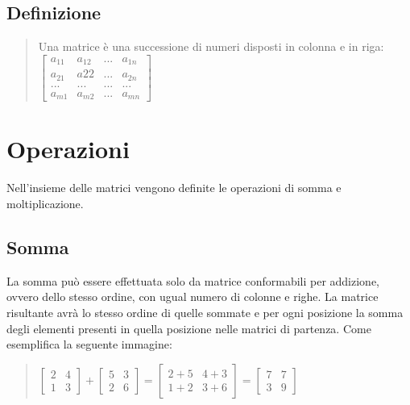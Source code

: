 \documentclass[a4paper]{article}
\begin{document}
\subsection{Definizione}

\vspace*{\fill} 
\begin{quote} 
\centering 
Una matrice è una successione di numeri disposti in colonna e in riga:
\bigskip \\
$\left[\begin{matrix}a_{11} & a_{12} & ... & a_{1n} \\ a_{21} & a{22} & ... & a_{2n} \\ ... & ... & ... & ...\\ a_{m1} & a_{m2} & ... & a_{mn}\end{matrix}\right]
$
\end{quote}
\vspace*{\fill}

\section{Operazioni}
Nell'insieme delle matrici vengono definite le operazioni di somma e moltiplicazione.

\subsection{Somma}
La somma può essere effettuata solo da matrice conformabili per addizione, ovvero dello stesso ordine, con ugual numero di colonne e righe. La matrice risultante avrà lo stesso ordine di quelle sommate e per ogni posizione la somma degli elementi presenti in quella posizione nelle matrici di partenza. Come esemplifica la seguente immagine:
\\
\begin{quote} \centering $\left[\begin{matrix}2 & 4 \\ 1 & 3\end{matrix}\right] + \left[\begin{matrix}5 & 3 \\ 2 & 6\end{matrix}\right] = \left[\begin{matrix} 2+5 & 4+3 \\ 1+2 & 3+6\end{matrix}\right] = \left[\begin{matrix}7 & 7 \\ 3 & 9\end{matrix}\right]
$\end{quote}
\end{document}
